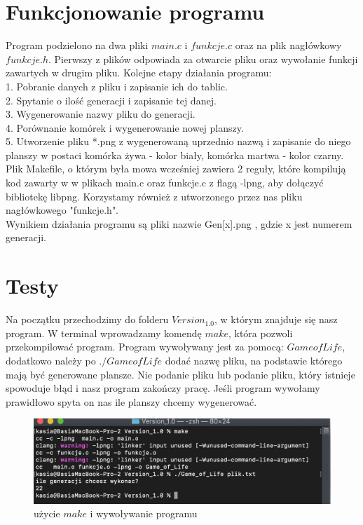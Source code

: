\documentclass[11pt]{article}
\begin{document}
\section{Funkcjonowanie programu}
Program podzielono na dwa pliki $main.c$ i $funkcje.c$ oraz na plik nagłówkowy $funkcje.h$. Pierwszy z plików odpowiada za otwarcie pliku oraz wywołanie funkcji zawartych w drugim pliku.
Kolejne etapy działania programu:
\\
1.	Pobranie danych z pliku i zapisanie ich do tablic.
\\
2.	Spytanie o ilość generacji i zapisanie tej danej.
\\
3.	Wygenerowanie nazwy pliku do generacji.
\\
4.	Porównanie komórek i wygenerowanie nowej planszy.
\\
5.  Utworzenie pliku *.png z wygenerowaną uprzednio nazwą i zapisanie do niego planszy w postaci komórka żywa - kolor biały, komórka martwa - kolor czarny.
\\
Plik Makefile, o którym była mowa wcześniej zawiera 2 reguły, które kompilują kod zawarty w w plikach main.c oraz funkcje.c z flagą -lpng, aby dołączyć bibliotekę libpng. Korzystamy również z utworzonego przez nas pliku nagłówkowego "funkcje.h".
\\
Wynikiem działania programu są pliki nazwie Gen[x].png , gdzie x jest numerem generacji.

\section{Testy}
Na początku przechodzimy do folderu $Version_1.0$, w którym znajduje się nasz program. W terminal wprowadzamy komendę $make$, która pozwoli przekompilować program. Program wywoływany jest za pomocą: $GameofLife$, dodatkowo należy po $./GameofLife$ dodać nazwę pliku, na podstawie którego mają być generowane plansze. Nie podanie pliku lub podanie pliku, który istnieje spowoduje błąd i nasz program zakończy pracę. Jeśli program wywołamy prawidłowo spyta on nas ile planszy chcemy wygenerować.

\begin{figure}[h!]
	\includegraphics[width=\linewidth]{wywolanie.png}
	\caption{użycie $make$ i wywoływanie programu}
\end{figure}
\end{document}
